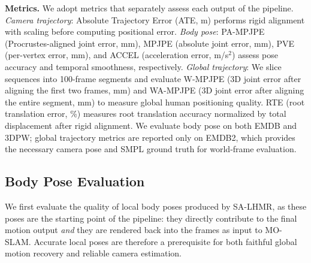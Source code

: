 \noindent\textbf{Metrics.}
We adopt metrics that separately assess each output of the pipeline.
\emph{Camera trajectory}: Absolute Trajectory Error (ATE, m) performs rigid alignment with scaling before computing positional error.
\emph{Body pose}: PA-MPJPE (Procrustes-aligned joint error, mm), MPJPE (absolute joint error, mm), PVE (per-vertex error, mm), and ACCEL (acceleration error, m/s$^2$) assess pose accuracy and temporal smoothness, respectively.
\emph{Global trajectory}: We slice sequences into 100-frame segments and evaluate W-MPJPE (3D joint error after aligning the first two frames, mm) and WA-MPJPE (3D joint error after aligning the entire segment, mm) to measure global human positioning quality. RTE (root translation error, \%) measures root translation accuracy normalized by total displacement after rigid alignment. We evaluate body pose on both EMDB and 3DPW; global trajectory metrics are reported only on EMDB2, which provides the necessary camera pose and SMPL ground truth for world-frame evaluation.


\subsection{Body Pose Evaluation}
\label{sec:exp-pose}

We first evaluate the quality of local body poses produced by SA-LHMR, as these poses are the starting point of the pipeline: they directly contribute to the final motion output \emph{and} they are rendered back into the frames as input to MO-SLAM. Accurate local poses are therefore a prerequisite for both faithful global motion recovery and reliable camera estimation.

